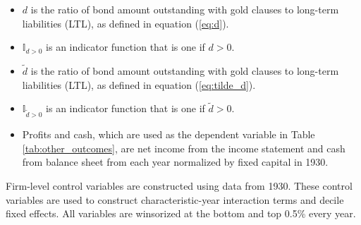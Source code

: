 \begin{itemize}
        \item $d$ is the ratio of bond amount outstanding with gold clauses to long-term liabilities (LTL), as defined in equation (\ref{eq:d}). 
        
        \item $\mathbb{I}_{d>0}$ is an indicator function that is one if $d > 0$. 

        \item $\tilde{d}$ is the ratio of bond amount outstanding with gold clauses to long-term liabilities (LTL), as defined in equation (\ref{eq:tilde_d}). 
        
        \item $\mathbb{I}_{\tilde{d}>0}$ is an indicator function that is one if $\tilde{d} > 0$. 
       
        \item Profits and cash, which are used as the dependent variable in Table \ref{tab:other_outcomes}, are net income from the income statement and cash from balance sheet from each year normalized by fixed capital in 1930. 
	\end{itemize}

    Firm-level control variables are constructed using data from 1930. These control variables are used to construct characteristic-year interaction terms and decile fixed effects. All variables are winsorized at the bottom and top 0.5\% every year. 